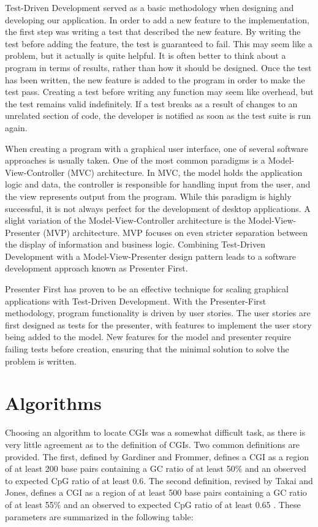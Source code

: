 \documentclass{bioinfo}
\begin{document}
Test-Driven Development served as a basic methodology when designing
and developing our application. In order to add a new feature to the
implementation, the first step was writing a test that described the
new feature. By writing the test before adding the feature, the test
is guaranteed to fail. This may seem like a problem, but it actually
is quite helpful. It is often better to think about a program in terms
of results, rather than how it should be designed. Once the test has
been written, the new feature is added to the program in order to make
the test pass. Creating a test before writing any function may seem like
overhead, but the test remains valid indefinitely. If a test breaks as
a result of changes to an unrelated section of code, the developer is
notified as soon as the test suite is run again.

When creating a program with a graphical user interface, one of
several software approaches is usually taken. One of the most common
paradigms is a Model-View-Controller (MVC) architecture. In MVC, the
model holds the application logic and data, the controller is
responsible for handling input from the user, and the view represents
output from the program. While this paradigm is highly successful, it
is not always perfect for the development of desktop applications. A
slight variation of the Model-View-Controller architecture is the
Model-View-Presenter (MVP) architecture. MVP focuses on even stricter
separation between the display of information and business
logic. Combining Test-Driven Development with a Model-View-Presenter
design pattern leads to a software development approach known as
Presenter First.

Presenter First \citep{Alles:2006:PFO:1155439.1155482} has proven to
be an effective technique for scaling graphical applications with
Test-Driven Development. With the Presenter-First methodology, program
functionality is driven by user stories. The user stories are first
designed as tests for the presenter, with features to implement the
user story being added to the model. New features for the model and
presenter require failing tests before creation, ensuring that the
minimal solution to solve the problem is written.

\section{Algorithms}

Choosing an algorithm to locate CGIs was a somewhat difficult
task, as there is very little agreement as to the definition of
CGIs. Two common definitions are provided. The first, defined by
Gardiner and Frommer, defines a CGI as a region of at least 200 base
pairs containing a GC ratio of at least 50\% and an observed to
expected CpG ratio of at least 0.6. The second definition, revised by
Takai and Jones, defines a CGI as a region of at least 500 base pairs containing a GC ratio of at least 55\% and an observed to
expected CpG ratio of at least 0.65 \citep{pmid11891299}. These
parameters are summarized in the following table: \\
\end{document}
